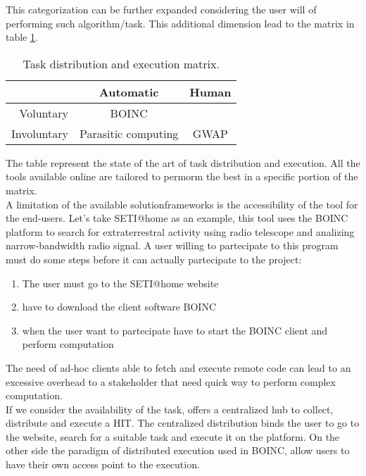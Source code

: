 This categorization can be further expanded considering the user will of performing such algorithm/task.
This additional dimension lead to the matrix in table \ref{tab:matrix}.
\begin{table}[htb]
	\caption{Task distribution and execution matrix.}
	\label{tab:matrix}
	\centering
	\begin{tabular}{r|c|c}
		 & \textbf{Automatic} & \textbf{Human}\\
		\hline
		Voluntary & \acs{BOINC} & \cite{turk}\\
		\hline
		Involuntary & Parasitic computing & \acs{GWAP}
	\end{tabular}
\end{table}

The table represent the state of the art of task distribution and execution. All the tools available
online are tailored to permorm the best in a specific portion of the matrix.\\

A limitation of the available solutionframeworks is the accessibility of the tool for the end-users.
Let's take \ac{SETI@home} as an example, this tool uses the \ac{BOINC} platform to search for
extraterrestral activity using radio telescope and analizing narrow-bandwidth radio signal. A
user willing to partecipate to this program must do some steps before it can actually partecipate
to the project:
\begin{enumerate}
	\item The user must go to the \ac{SETI@home} website
	\item have to download the client software \ac{BOINC}
	\item when the user want to partecipate have to start the \ac{BOINC} client and perform computation
\end{enumerate}

The need of ad-hoc clients able to fetch and execute remote code can lead to an excessive overhead
to a stakeholder that need quick way to perform complex computation.\\

If we consider the availability of the task, \cite{turk} offers a centralized hub to collect, distribute
and execute a \ac{HIT}. The centralized distribution binds the user to go to the \cite{turk} website,
search for a suitable task and execute it on the \cite{turk} platform. On the other side the paradigm of
distributed execution used in \ac{BOINC}, allow users to have their own access point to the execution.

